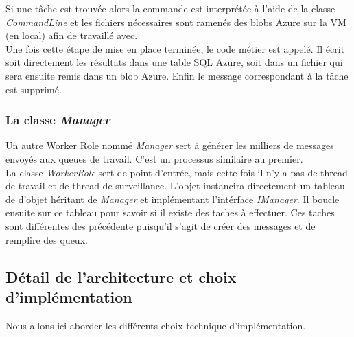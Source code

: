 Si une tâche est trouvée alors la commande est interprétée à l'aide de
la classe \textit{CommandLine} et les fichiers nécessaires sont
ramenés des blobs Azure sur la VM (en local) afin de travaillé avec.\\

Une fois cette étape de mise en place terminée, le code métier est
appelé. Il écrit soit directement les résultats dans une table SQL
Azure, soit dans un fichier qui sera ensuite remis dans un blob Azure.
Enfin le message correspondant à la tâche est supprimé.


\subsubsection{La classe \textit{Manager}}

Un autre Worker Role nommé \textit{Manager} sert à générer les
milliers de messages envoyés aux queues de travail. C'est un processus
similaire au premier. \\

La classe \textit{WorkerRole} sert de point d'entrée, mais cette fois
il n'y a pas de thread de travail et de thread de
surveillance. L'objet instancira directement un tableau de d'objet
héritant de \textit{Manager} et implémentant l'intérface
\textit{IManager}. Il boucle ensuite sur ce tableau pour savoir si il
existe des taches à effectuer. Ces taches sont différentes des
précédente puisqu'il s'agit de créer des messages et de remplire des
queux.









%
%

\subsection{Détail de l'architecture et choix d'implémentation}
Nous allons ici aborder les différents choix technique
d'implémentation. %

\subsubsection{}

\subsubsection{}

\subsubsection{}

\subsubsection{}
